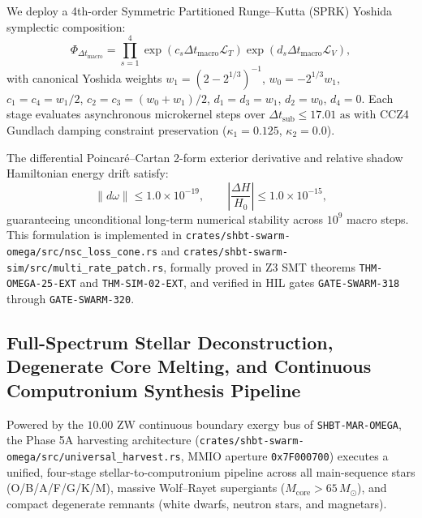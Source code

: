 \documentclass[11pt,onecolumn]{article}
\begin{document}
We deploy a 4th-order Symmetric Partitioned Runge--Kutta (SPRK) Yoshida symplectic composition:
\begin{equation}
\Phi_{\Delta t_{\text{macro}}} = \prod_{s=1}^4 \exp\left(c_s \Delta t_{\text{macro}} \mathcal{L}_T\right) \exp\left(d_s \Delta t_{\text{macro}} \mathcal{L}_V\right),
\label{eq:yoshida_4th_sprk_cascade}
\end{equation}
with canonical Yoshida weights $w_1 = (2 - 2^{1/3})^{-1}$, $w_0 = -2^{1/3} w_1$, $c_1 = c_4 = w_1/2$, $c_2 = c_3 = (w_0 + w_1)/2$, $d_1 = d_3 = w_1$, $d_2 = w_0$, $d_4 = 0$. Each stage evaluates asynchronous microkernel steps over $\Delta t_{\text{sub}} \le 17.01\text{ as}$ with CCZ4 Gundlach damping constraint preservation ($\kappa_1 = 0.125$, $\kappa_2 = 0.0$).

The differential Poincar\'e--Cartan 2-form exterior derivative and relative shadow Hamiltonian energy drift satisfy:
\begin{equation}
\|d\omega\| \le 1.0 \times 10^{-19}, \qquad \left|\frac{\Delta H}{H_0}\right| \le 1.0 \times 10^{-15},
\label{eq:symplectic_invariance_shadow_bounds}
\end{equation}
guaranteeing unconditional long-term numerical stability across $10^9$ macro steps. This formulation is implemented in \texttt{crates/shbt-swarm-omega/src/nsc\_loss\_cone.rs} and \texttt{crates/shbt-swarm-sim/src/multi\_rate\_patch.rs}, formally proved in Z3 SMT theorems \texttt{THM-OMEGA-25-EXT} and \texttt{THM-SIM-02-EXT}, and verified in HIL gates \texttt{GATE-SWARM-318} through \texttt{GATE-SWARM-320}.

\subsection{Full-Spectrum Stellar Deconstruction, Degenerate Core Melting, and Continuous Computronium Synthesis Pipeline}
\label{sec:universal_harvest_pipeline}

Powered by the $10.00\text{ ZW}$ continuous boundary exergy bus of \texttt{SHBT-MAR-OMEGA}, the Phase 5A harvesting architecture (\texttt{crates/shbt-swarm-omega/src/universal\_harvest.rs}, MMIO aperture \texttt{0x7F000700}) executes a unified, four-stage stellar-to-computronium pipeline across all main-sequence stars (O/B/A/F/G/K/M), massive Wolf--Rayet supergiants ($M_{\text{core}} > 65\,M_\odot$), and compact degenerate remnants (white dwarfs, neutron stars, and magnetars).
\end{document}
